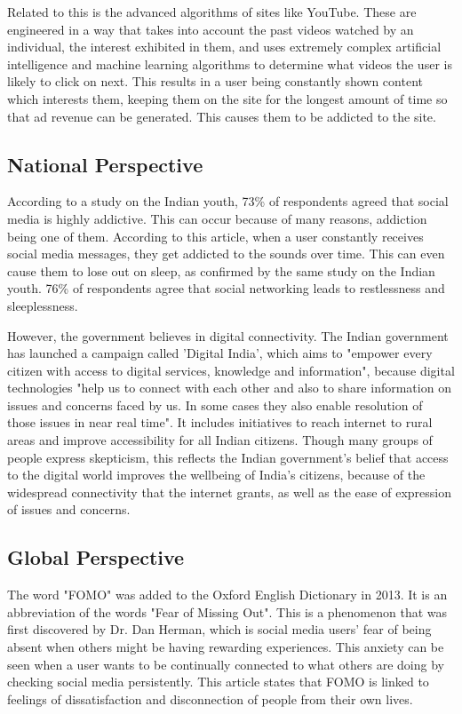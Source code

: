 \documentclass[a4paper, 11pt]{article}
\begin{document}
    Related to this is the advanced algorithms of sites like YouTube. These are engineered in a way that takes into account the past videos watched by an individual, the interest exhibited in them, and uses extremely complex artificial intelligence and machine learning algorithms to determine what videos the user is likely to click on next.\cite{youtube-algorithm} This results in a user being constantly shown content which interests them, keeping them on the site for the longest amount of time so that ad revenue can be generated. This causes them to be addicted to the site.

    \subsection{National Perspective}
       According to a study on the Indian youth, 73\% of respondents agreed that social media is highly addictive.\cite{indian-youth-study} This can occur because of many reasons, addiction being one of them. According to this article, when a user constantly receives social media messages, they get addicted to the sounds over time. \cite{your-gadgets-are-robbing-you-of-your-sleep} This can even cause them to lose out on sleep, as confirmed by the same study on the Indian youth. 76\% of respondents agree that social networking leads to restlessness and sleeplessness.

       However, the government believes in digital connectivity. The Indian government has launched a campaign called 'Digital India', which aims to "empower every citizen with access to digital services, knowledge and information", because digital technologies "help us to connect with each other and also to share information on issues and concerns faced by us. In some cases they also enable resolution of those issues in near real time".\cite{digital-india-gov} It includes initiatives to reach internet to rural areas and improve accessibility for all Indian citizens. Though many groups of people express skepticism, this reflects the Indian government's belief that access to the digital world improves the wellbeing of India's citizens, because of the widespread connectivity that the internet grants, as well as the ease of expression of issues and concerns. \cite{digital-india-thehindu, digital-india-thehindu-2}

    \subsection{Global Perspective}
        The word "FOMO" was added to the Oxford English Dictionary in 2013. It is an abbreviation of the words "Fear of Missing Out". This is a phenomenon that was first discovered by Dr. Dan Herman, which is social media users' fear of being absent when others might be having rewarding experiences.\cite{wikipedia-fomo} This anxiety can be seen when a user wants to be continually connected to what others are doing by checking social media persistently. This article states that FOMO is linked to feelings of dissatisfaction and disconnection of people from their own lives.\cite{fomo-science}
\end{document}

